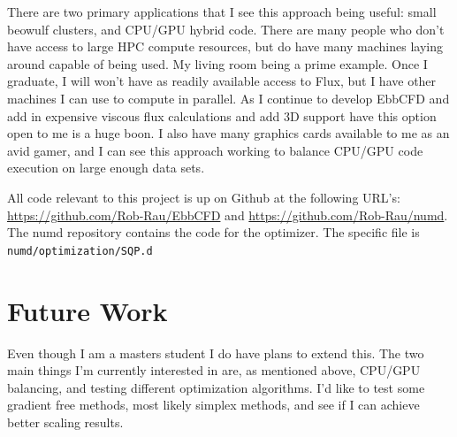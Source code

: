 \documentclass[12pt,parskip=full]{article}
\numberwithin{subsection}{section}
\begin{document}
		There are two primary applications that I see this approach being useful: small beowulf clusters, and CPU/GPU hybrid code. There are many people
		who don't have access to large HPC compute resources, but do have many machines laying around capable of being used. My living room being a prime
		example. Once I graduate, I will won't have as readily available access to Flux, but I have other machines I can use to compute in parallel. As I
		continue to develop EbbCFD and add in expensive viscous flux calculations and add 3D support have this option open to me is a huge boon. I also
		have many graphics cards available to me as an avid gamer, and I can see this approach working to balance CPU/GPU code execution on large enough
		data sets.

		All code relevant to this project is up on Github at the following URL's: \url{https://github.com/Rob-Rau/EbbCFD} and \url{https://github.com/Rob-Rau/numd}.
		The numd repository contains the code for the optimizer. The specific file is \verb|numd/optimization/SQP.d|
	\section{Future Work}
		Even though I am a masters student I do have plans to extend this. The two main things I'm currently interested in are, as mentioned above, CPU/GPU
		balancing, and testing different optimization algorithms. I'd like to test some gradient free methods, most likely simplex methods, and see if I
		can achieve better scaling results. 
\end{document}
